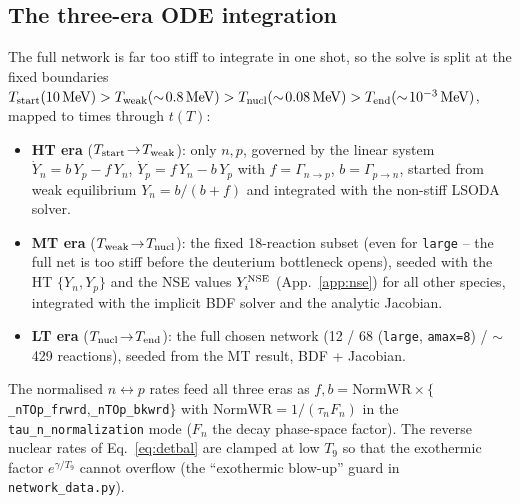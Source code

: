 \documentclass[11pt,a4paper]{article}
\newcommand{\code}[1]{\texttt{#1}}
\begin{document}
\subsection{The three-era ODE integration}\label{sec:eras}
The full network is far too stiff to integrate in one shot, so the solve is
split at the fixed boundaries
$T_{\rm start}(10\,\mathrm{MeV})>T_{\rm weak}(\sim\!0.8\,\mathrm{MeV})>
T_{\rm nucl}(\sim\!0.08\,\mathrm{MeV})>T_{\rm end}(\sim\!10^{-3}\,\mathrm{MeV})$,
mapped to times through $t(T)$:
\begin{itemize}\itemsep2pt
  \item \textbf{HT era} ($T_{\rm start}\!\to\!T_{\rm weak}$): only $n,p$, governed
    by the linear system
    $\dot Y_n=b\,Y_p-f\,Y_n$, $\dot Y_p=f\,Y_n-b\,Y_p$ with
    $f=\Gamma_{n\to p}$, $b=\Gamma_{p\to n}$, started from weak equilibrium
    $Y_n=b/(b+f)$ and integrated with the non-stiff LSODA solver.
  \item \textbf{MT era} ($T_{\rm weak}\!\to\!T_{\rm nucl}$): the fixed
    18-reaction subset (even for \code{large} -- the full net is too stiff before
    the deuterium bottleneck opens), seeded with the HT $\{Y_n,Y_p\}$ and the NSE
    values $Y_i^{\rm NSE}$ (App.~\ref{app:nse}) for all other species, integrated
    with the implicit BDF solver and the analytic Jacobian.
  \item \textbf{LT era} ($T_{\rm nucl}\!\to\!T_{\rm end}$): the full chosen
    network (12 / 68 (\code{large}, \code{amax=8}) / $\sim$429 reactions),
    seeded from the MT result, BDF + Jacobian.
\end{itemize}
The normalised $n\!\leftrightarrow\!p$ rates feed all three eras as
$f,b=\text{NormWR}\times\{$\code{\_nTOp\_frwrd},\code{\_nTOp\_bkwrd}$\}$ with
$\text{NormWR}=1/(\tau_n F_n)$ in the \code{tau\_n\_normalization} mode ($F_n$
the decay phase-space factor). The reverse nuclear rates of Eq.~\eqref{eq:detbal}
are clamped at low $T_9$ so that the exothermic factor $e^{\gamma/T_9}$ cannot
overflow (the ``exothermic blow-up'' guard in \code{network\_data.py}).
\end{document}
